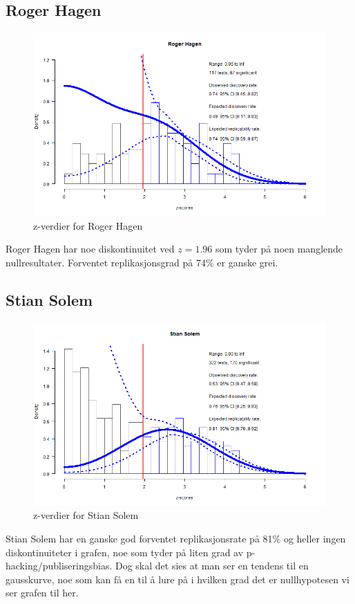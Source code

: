 \documentclass[doc,norsk]{apa7}
\begin{document}
\subsection{Roger Hagen}
\begin{figure}[h!]
    \centering
    \includegraphics[width=\textwidth]{images/Roger Hagen.png}
    \caption{z-verdier for Roger Hagen}
\end{figure}
Roger Hagen har noe diskontinuitet ved $z=1.96$ som tyder på noen manglende nullresultater. Forventet replikasjonsgrad på 74\% er ganske grei.

\subsection{Stian Solem}
\begin{figure}[h!]
    \centering
    \includegraphics[width=\textwidth]{images/Stian Solem.png}
    \caption{z-verdier for Stian Solem}
\end{figure}
Stian Solem har en ganske god forventet replikasjonsrate på 81\% og heller ingen diskontinuiteter i grafen, noe som tyder på liten grad av p-hacking/publiseringsbias. Dog skal det sies at man ser en tendens til en gausskurve, noe som kan få en til å lure på i hvilken grad det er nullhypotesen vi ser grafen til her.
\end{document}

